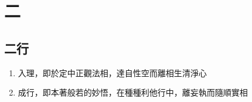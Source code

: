 \section{二}

\subsection{二行}
\begin{enumerate}
  \item 入理，即於定中正觀法相，達自性空而離相生清淨心
  \item 成行，即本著般若的妙悟，在種種利他行中，離妄執而隨順實相
\end{enumerate}
